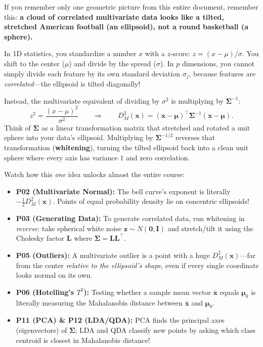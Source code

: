 \documentclass[11pt, a4paper]{article}
\begin{document}
If you remember only one geometric picture from this entire document, remember this: \textbf{a cloud of correlated multivariate data looks like a tilted, stretched American football (an ellipsoid), not a round basketball (a sphere).}

In 1D statistics, you standardize a number $x$ with a $z$-score: $z = (x - \mu)/\sigma$. You shift to the center ($\mu$) and divide by the spread ($\sigma$). In $p$ dimensions, you cannot simply divide each feature by its own standard deviation $\sigma_j$, because features are \emph{correlated}---the ellipsoid is tilted diagonally!

Instead, the multivariate equivalent of dividing by $\sigma^2$ is multiplying by $\boldsymbol{\Sigma}^{-1}$:
\[
    z^2 = \frac{(x - \mu)^2}{\sigma^2}
    \qquad \Longrightarrow \qquad
    D_M^2(\mathbf{x}) = (\mathbf{x} - \boldsymbol{\mu})^\top \boldsymbol{\Sigma}^{-1} (\mathbf{x} - \boldsymbol{\mu}).
\]
Think of $\boldsymbol{\Sigma}$ as a linear transformation matrix that stretched and rotated a unit sphere into your data's ellipsoid. Multiplying by $\boldsymbol{\Sigma}^{-1/2}$ reverses that transformation (\textbf{whitening}), turning the tilted ellipsoid back into a clean unit sphere where every axis has variance $1$ and zero correlation.

Watch how this \emph{one} idea unlocks almost the entire course:
\begin{itemize}
    \item \textbf{P02 (Multivariate Normal):} The bell curve's exponent is literally $-\frac{1}{2} D_M^2(\mathbf{x})$. Points of equal probability density lie on concentric ellipsoids!
    \item \textbf{P03 (Generating Data):} To generate correlated data, run whitening in \emph{reverse}: take spherical white noise $\mathbf{z} \sim N(\mathbf{0}, \mathbf{I})$ and stretch/tilt it using the Cholesky factor $\mathbf{L}$ where $\boldsymbol{\Sigma} = \mathbf{L}\mathbf{L}^\top$.
    \item \textbf{P05 (Outliers):} A multivariate outlier is a point with a huge $D_M^2(\mathbf{x})$---far from the center \emph{relative to the ellipsoid's shape}, even if every single coordinate looks normal on its own.
    \item \textbf{P06 (Hotelling's $T^2$):} Testing whether a sample mean vector $\bar{\mathbf{x}}$ equals $\boldsymbol{\mu}_0$ is literally measuring the Mahalanobis distance between $\bar{\mathbf{x}}$ and $\boldsymbol{\mu}_0$.
    \item \textbf{P11 (PCA) \& P12 (LDA/QDA):} PCA finds the principal axes (eigenvectors) of $\boldsymbol{\Sigma}$; LDA and QDA classify new points by asking which class centroid is closest in Mahalanobis distance!
\end{itemize}
\end{document}
